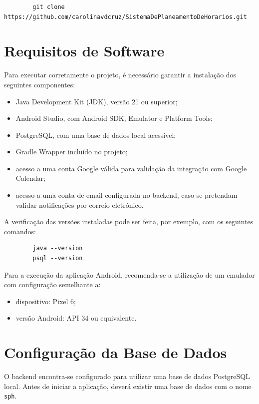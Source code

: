\documentclass[]{article}
\begin{document}
    \begin{verbatim}
        git clone https://github.com/carolinavdcruz/SistemaDePlaneamentoDeHorarios.git
    \end{verbatim}
    \section{Requisitos de Software}

    Para executar corretamente o projeto, é necessário garantir a instalação dos seguintes componentes:

    \begin{itemize}
        \item Java Development Kit (JDK), versão 21 ou superior;
        \item Android Studio, com Android SDK, Emulator e Platform Tools;
        \item PostgreSQL, com uma base de dados local acessível;
        \item Gradle Wrapper incluído no projeto;
        \item acesso a uma conta Google válida para validação da integração com Google Calendar;
        \item acesso a uma conta de email configurada no backend, caso se pretendam validar notificações por correio eletrónico.
    \end{itemize}

    A verificação das versões instaladas pode ser feita, por exemplo, com os seguintes comandos:

    \begin{verbatim}
        java --version
        psql --version
    \end{verbatim}

    Para a execução da aplicação Android, recomenda-se a utilização de um emulador com configuração semelhante a:

    \begin{itemize}
        \item dispositivo: Pixel 6;
        \item versão Android: API 34 ou equivalente.
    \end{itemize}

    \section{Configuração da Base de Dados}

    O backend encontra-se configurado para utilizar uma base de dados PostgreSQL local. Antes de iniciar a aplicação, deverá existir uma base de dados com o nome \texttt{sph}.
\end{document}
